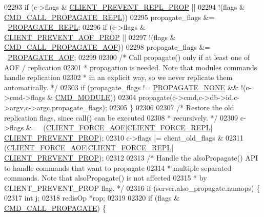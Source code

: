 \begin{DoxyCode}
{{{{{{{{{{{{{{{{{{{{{{{{{{{{{02293         \textcolor{keywordflow}{if} (c->flags & \hyperlink{server_8h_a01c18c16bc758787b5cfc287eb7b089e}{CLIENT\_PREVENT\_REPL\_PROP} ||
02294             !(flags & \hyperlink{server_8h_a69e4a8fdb26588e1028deb20fd51424a}{CMD\_CALL\_PROPAGATE\_REPL}))
02295                 propagate\_flags &= ~\hyperlink{server_8h_a59c6e025b4ed85642a0472fc3e73e298}{PROPAGATE\_REPL};
02296         \textcolor{keywordflow}{if} (c->flags & \hyperlink{server_8h_a9948ae3a2778b5a06b704231b921e7fa}{CLIENT\_PREVENT\_AOF\_PROP} ||
02297             !(flags & \hyperlink{server_8h_a3ca848c94df18641ac372c58fca0e236}{CMD\_CALL\_PROPAGATE\_AOF}))
02298                 propagate\_flags &= ~\hyperlink{server_8h_a542fb79924ca427c866fd63632f60777}{PROPAGATE\_AOF};
02299 
02300         \textcolor{comment}{/* Call propagate() only if at least one of AOF / replication}
02301 \textcolor{comment}{         * propagation is needed. Note that modules commands handle replication}
02302 \textcolor{comment}{         * in an explicit way, so we never replicate them automatically. */}
02303         \textcolor{keywordflow}{if} (propagate\_flags != \hyperlink{server_8h_a0c7409da047d754c0adeb001025acc03}{PROPAGATE\_NONE} && !(c->cmd->flags & 
      \hyperlink{server_8h_accabd32f20281543986166c219124f9e}{CMD\_MODULE}))
02304             propagate(c->cmd,c->db->id,c->argv,c->argc,propagate\_flags);
02305     \}
02306 
02307     \textcolor{comment}{/* Restore the old replication flags, since call() can be executed}
02308 \textcolor{comment}{     * recursively. */}
02309     c->flags &= ~(\hyperlink{server_8h_a451c1542a74f0181600d043df3f1b19a}{CLIENT\_FORCE\_AOF}|\hyperlink{server_8h_a9f89484284fb0956374bd7b6fa639602}{CLIENT\_FORCE\_REPL}|
      \hyperlink{server_8h_aea3bfee2e140aed0fc93bf087026f9a3}{CLIENT\_PREVENT\_PROP});
02310     c->flags |= client\_old\_flags &
02311         (\hyperlink{server_8h_a451c1542a74f0181600d043df3f1b19a}{CLIENT\_FORCE\_AOF}|\hyperlink{server_8h_a9f89484284fb0956374bd7b6fa639602}{CLIENT\_FORCE\_REPL}|
      \hyperlink{server_8h_aea3bfee2e140aed0fc93bf087026f9a3}{CLIENT\_PREVENT\_PROP});
02312 
02313     \textcolor{comment}{/* Handle the alsoPropagate() API to handle commands that want to propagate}
02314 \textcolor{comment}{     * multiple separated commands. Note that alsoPropagate() is not affected}
02315 \textcolor{comment}{     * by CLIENT\_PREVENT\_PROP flag. */}
02316     \textcolor{keywordflow}{if} (server.also\_propagate.numops) \{
02317         \textcolor{keywordtype}{int} j;
02318         redisOp *rop;
02319 
02320         \textcolor{keywordflow}{if} (flags & \hyperlink{server_8h_a6ee9ed603f975d0d2b6ae44f1907565f}{CMD\_CALL\_PROPAGATE}) \{
}}}}}}}}}}}}}}}}}}}}}}}}}}}}}
\end{DoxyCode}
